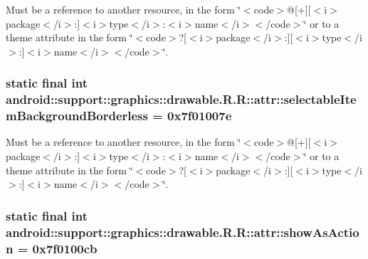 Must be a reference to another resource, in the form \char`\"{}$<$code$>$@\mbox{[}+\mbox{]}\mbox{[}$<$i$>$package$<$/i$>$:\mbox{]}$<$i$>$type$<$/i$>$:$<$i$>$name$<$/i$>$$<$/code$>$\char`\"{} or to a theme attribute in the form \char`\"{}$<$code$>$?\mbox{[}$<$i$>$package$<$/i$>$:\mbox{]}\mbox{[}$<$i$>$type$<$/i$>$:\mbox{]}$<$i$>$name$<$/i$>$$<$/code$>$\char`\"{}. \hypertarget{classandroid_1_1support_1_1graphics_1_1drawable_1_1_r_1_1attr_7ed6d26366c620cdb135267f6837382a}{
\subsubsection[{selectableItemBackgroundBorderless}]{\setlength{\rightskip}{0pt plus 5cm}static final int android::support::graphics::drawable.R.R::attr::selectableItemBackgroundBorderless = 0x7f01007e}}
\label{classandroid_1_1support_1_1graphics_1_1drawable_1_1_r_1_1attr_7ed6d26366c620cdb135267f6837382a}


Must be a reference to another resource, in the form \char`\"{}$<$code$>$@\mbox{[}+\mbox{]}\mbox{[}$<$i$>$package$<$/i$>$:\mbox{]}$<$i$>$type$<$/i$>$:$<$i$>$name$<$/i$>$$<$/code$>$\char`\"{} or to a theme attribute in the form \char`\"{}$<$code$>$?\mbox{[}$<$i$>$package$<$/i$>$:\mbox{]}\mbox{[}$<$i$>$type$<$/i$>$:\mbox{]}$<$i$>$name$<$/i$>$$<$/code$>$\char`\"{}. \hypertarget{classandroid_1_1support_1_1graphics_1_1drawable_1_1_r_1_1attr_21e8ccf03882a6252b96501e274fcb31}{
\subsubsection[{showAsAction}]{\setlength{\rightskip}{0pt plus 5cm}static final int android::support::graphics::drawable.R.R::attr::showAsAction = 0x7f0100cb}}
\label{classandroid_1_1support_1_1graphics_1_1drawable_1_1_r_1_1attr_21e8ccf03882a6252b96501e274fcb31}


